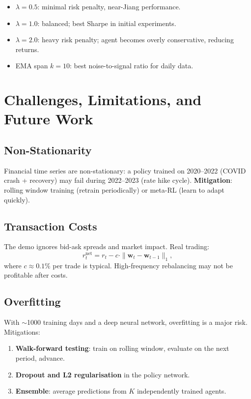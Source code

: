\documentclass[12pt,a4paper]{article}
\begin{document}
\begin{itemize}[nosep]
  \item $\lambda = 0.5$: minimal risk penalty, near-Jiang performance.
  \item $\lambda = 1.0$: balanced; best Sharpe in initial experiments.
  \item $\lambda = 2.0$: heavy risk penalty; agent becomes overly
        conservative, reducing returns.
  \item EMA span $k = 10$: best noise-to-signal ratio for daily data.
\end{itemize}

\section{Challenges, Limitations, and Future Work}

\subsection{Non-Stationarity}

Financial time series are non-stationary: a policy trained on 2020--2022
(COVID crash + recovery) may fail during 2022--2023 (rate hike cycle).
\textbf{Mitigation}: rolling window training (retrain periodically) or
meta-RL (learn to adapt quickly).

\subsection{Transaction Costs}

The demo ignores bid-ask spreads and market impact.  Real trading:
\begin{equation}
  r_t^{\text{net}} = r_t - c \cdot \|\mathbf{w}_t - \mathbf{w}_{t-1}\|_1,
\end{equation}
where $c \approx 0.1\%$ per trade is typical.  High-frequency rebalancing
may not be profitable after costs.

\subsection{Overfitting}

With $\sim$1000 training days and a deep neural network, overfitting is
a major risk.  Mitigations:
\begin{enumerate}[nosep]
  \item \textbf{Walk-forward testing}: train on rolling window, evaluate
        on the next period, advance.
  \item \textbf{Dropout and L2 regularisation} in the policy network.
  \item \textbf{Ensemble}: average predictions from $K$ independently
        trained agents.
\end{enumerate}
\end{document}
